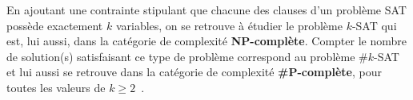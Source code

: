 
En ajoutant une contrainte stipulant que chacune des clauses d'un problème SAT possède exactement $k$ variables, on se retrouve à étudier le problème $k$-SAT qui est, lui aussi, dans la catégorie de complexité \textbf{NP-complète}.
Compter le nombre de solution(s) satisfaisant ce type de problème correspond au problème \#$k$-SAT et lui aussi se retrouve dans la catégorie de complexité \textbf{\#P-complète}, pour toutes les valeurs de $k \geq 2$~\cite{valiant_complexity_1979}.

